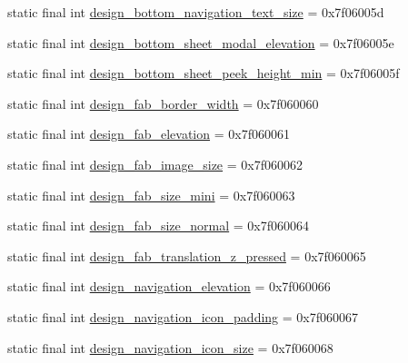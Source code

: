 \begin{DoxyCompactItemize}
static final int \mbox{\hyperlink{classandroid_1_1support_1_1design_1_1R_1_1dimen_a48251c3129267204da46c54fae4d0e9e}{design\+\_\+bottom\+\_\+navigation\+\_\+text\+\_\+size}} = 0x7f06005d
\item 
static final int \mbox{\hyperlink{classandroid_1_1support_1_1design_1_1R_1_1dimen_a36b589950beca95dbbf0d753945704dc}{design\+\_\+bottom\+\_\+sheet\+\_\+modal\+\_\+elevation}} = 0x7f06005e
\item 
static final int \mbox{\hyperlink{classandroid_1_1support_1_1design_1_1R_1_1dimen_a123a533a83598358ea6371e77a861117}{design\+\_\+bottom\+\_\+sheet\+\_\+peek\+\_\+height\+\_\+min}} = 0x7f06005f
\item 
static final int \mbox{\hyperlink{classandroid_1_1support_1_1design_1_1R_1_1dimen_af4f3a9ee873d7757d2dd0be1c2cadf4b}{design\+\_\+fab\+\_\+border\+\_\+width}} = 0x7f060060
\item 
static final int \mbox{\hyperlink{classandroid_1_1support_1_1design_1_1R_1_1dimen_a6fe7a893bf5c66341ebde39a58bdcf97}{design\+\_\+fab\+\_\+elevation}} = 0x7f060061
\item 
static final int \mbox{\hyperlink{classandroid_1_1support_1_1design_1_1R_1_1dimen_a97b98ab868e0031b5a7d4931870db647}{design\+\_\+fab\+\_\+image\+\_\+size}} = 0x7f060062
\item 
static final int \mbox{\hyperlink{classandroid_1_1support_1_1design_1_1R_1_1dimen_ad2f1e3630649a6bf663595a91a73bb75}{design\+\_\+fab\+\_\+size\+\_\+mini}} = 0x7f060063
\item 
static final int \mbox{\hyperlink{classandroid_1_1support_1_1design_1_1R_1_1dimen_a1149e0b937576ec45f347e32bd7c0995}{design\+\_\+fab\+\_\+size\+\_\+normal}} = 0x7f060064
\item 
static final int \mbox{\hyperlink{classandroid_1_1support_1_1design_1_1R_1_1dimen_a51c58f3bb12ba528b250d93588890122}{design\+\_\+fab\+\_\+translation\+\_\+z\+\_\+pressed}} = 0x7f060065
\item 
static final int \mbox{\hyperlink{classandroid_1_1support_1_1design_1_1R_1_1dimen_aefa62bedc2505b09d491e969011487c7}{design\+\_\+navigation\+\_\+elevation}} = 0x7f060066
\item 
static final int \mbox{\hyperlink{classandroid_1_1support_1_1design_1_1R_1_1dimen_ae84d41ce904136aaafbbd73e8d23ed55}{design\+\_\+navigation\+\_\+icon\+\_\+padding}} = 0x7f060067
\item 
static final int \mbox{\hyperlink{classandroid_1_1support_1_1design_1_1R_1_1dimen_a09a0e74d4044391a347f715900c8ba05}{design\+\_\+navigation\+\_\+icon\+\_\+size}} = 0x7f060068

\end{DoxyCompactItemize}
